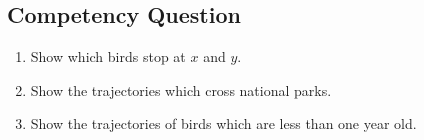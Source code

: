 \subsection{Competency Question}
\label{cqs:Spatiotemporal}
\begin{enumerate}[CQ1.]
\item Show which birds stop at $x$ and $y$.
\item Show the trajectories which cross national parks.
\item Show the trajectories of birds which are less than one year old.
\end{enumerate}

\newpage
